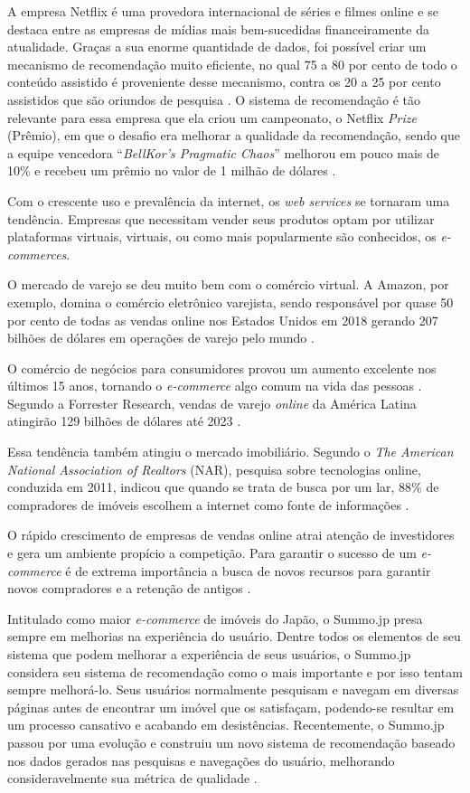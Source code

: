 A empresa Netflix é uma provedora internacional de séries e filmes online e se destaca entre as empresas de mídias mais bem-sucedidas financeiramente da atualidade. Graças a sua enorme quantidade de dados, foi possível criar um mecanismo de recomendação muito eficiente, no qual 75 a 80 por cento de todo o conteúdo assistido é proveniente desse mecanismo, contra os 20 a 25 por cento assistidos que são oriundos de pesquisa \cite{Kleinman:2014}. O sistema de recomendação é tão relevante para essa empresa que ela criou um campeonato, o Netflix \textit{Prize} (Prêmio), em que o desafio era melhorar a qualidade da recomendação, sendo que a equipe vencedora “\textit{BellKor's Pragmatic Chaos}” melhorou em pouco mais de 10\% e recebeu um prêmio no valor de 1 milhão de dólares \cite{netflixprize:2009}.

Com o crescente uso e prevalência da internet, os \textit{web services} se tornaram uma tendência. Empresas que necessitam vender seus produtos optam por utilizar plataformas virtuais, virtuais, ou como mais popularmente são conhecidos, os \textit{e-commerces}.

O mercado de varejo se deu muito bem com o comércio virtual. A Amazon, por exemplo, domina o comércio eletrônico varejista, sendo responsável por quase 50 por cento de todas as vendas online nos Estados Unidos em 2018 gerando 207 bilhões de dólares em operações de varejo pelo mundo \cite{JAKE:2019}.

O comércio de negócios para consumidores provou um aumento excelente nos últimos 15 anos, tornando o \textit{e-commerce} algo comum na vida das pessoas \cite{Jiang:2015}. Segundo a Forrester Research, vendas de varejo \textit{online} da América Latina atingirão 129 bilhões de dólares até 2023 \cite{Forrester:2019}.

Essa tendência também atingiu o mercado imobiliário. Segundo o \textit{The American National Association of Realtors} (NAR), pesquisa sobre tecnologias online, conduzida em 2011, indicou que quando se trata de busca por um lar, 88\% de compradores de imóveis escolhem a internet como fonte de informações \cite{Yuan:2013}.

O rápido crescimento de empresas de vendas online atrai atenção de investidores e gera um ambiente propício a competição. Para garantir o sucesso de um \textit{e-commerce} é de extrema importância a busca de novos recursos para garantir novos compradores e a retenção de antigos \cite{Jiang:2015}. 

Intitulado como maior \textit{e-commerce} de imóveis do Japão, o Summo.jp presa sempre em melhorias na experiência do usuário. Dentre todos os elementos de seu sistema que podem melhorar a experiência de seus usuários, o Summo.jp considera seu sistema de recomendação como o mais importante e por isso tentam sempre melhorá-lo. Seus usuários normalmente pesquisam e navegam em diversas páginas antes de encontrar um imóvel que os satisfaçam, podendo-se resultar em um processo cansativo e acabando em desistências. Recentemente, o Summo.jp passou por uma evolução e construiu um novo
sistema de recomendação baseado nos dados gerados nas pesquisas e navegações do usuário, melhorando consideravelmente sua métrica de qualidade \cite{Summo:2017}.

